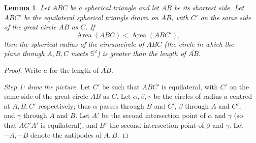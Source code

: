 \documentclass[11pt,openany]{book}
\theoremstyle{plain}
\newtheorem{lemma}[theorem]{Lemma}
\theoremstyle{definition}
\theoremstyle{remark}
\newcommand{\added}[1]{{\color{addcol}#1}}
\newcommand{\Sph}{\mathbb{S}}          %
\begin{document}
\begin{lemma}\label{L2:lem:triangle}
Let $ABC$ be a spherical triangle and let $\overline{AB}$ be its shortest side. Let $ABC'$ be the
equilateral spherical triangle drawn on $\overline{AB}$\added{, with $C'$ on the same side of the great
circle $AB$ as $C$}. If
\[
\operatorname{Area}(ABC) < \operatorname{Area}(ABC'),
\]
then the spherical radius of the circumcircle of $ABC$ (the circle in which the plane through $A,B,C$
meets $\Sph^2$) is greater than the length of $\overline{AB}$.
\end{lemma}

\begin{proof}
Write $a$ for the length of $\overline{AB}$.

\emph{Step 1: draw the picture.} Let $C'$ be such that $ABC'$ is equilateral, with $C'$ on the same side
of the great circle $AB$ as $C$. Let $\alpha,\beta,\gamma$ be the circles of radius $a$ centred at
$A,B,C'$ respectively\added{; thus $\alpha$ passes through $B$ and $C'$, $\beta$ through $A$ and $C'$,
and $\gamma$ through $A$ and $B$}. Let $A'$ be the second intersection point of $\alpha$ and $\gamma$
\added{(so that $AC'A'$ is equilateral)}, and $B'$ the second intersection point of $\beta$ and $\gamma$.
Let $-A,-B$ denote the antipodes of $A,B$.


\end{proof}
\end{document}
